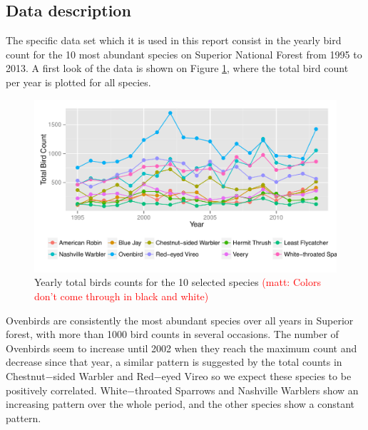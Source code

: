 \documentclass[a4paper]{article}
\newcommand{\matt}[1]{\textcolor{red}{(matt: #1)}}
\begin{document}
\subsection{Data description}
The specific data set which it is used in this report consist in the yearly bird count for the 10 most abundant species on Superior National Forest from 1995 to 2013.  A first look of the data is shown on Figure \ref{figtr}, where the total bird count per year is plotted for all species. 
\begin{figure}[hbpt]
\centering
\includegraphics[width =\textwidth]{rawtrend}
 \vspace{-.5in}
\caption{Yearly total birds counts for the 10 selected species \label{figtr} \matt{Colors don't come through in black and white}}
\end{figure}

Ovenbirds are consistently the most abundant species over all years in Superior forest,  with more than 1000 bird counts in several occasions. The number of Ovenbirds seem to increase until 2002 when they reach the maximum count and decrease since that year, a similar pattern is suggested by the total counts in Chestnut−sided Warbler and Red−eyed Vireo so we expect these species to be positively correlated.  White−throated Sparrows and Nashville Warblers show an increasing pattern over the whole period, and the other species show a constant pattern.  
%
\end{document}
